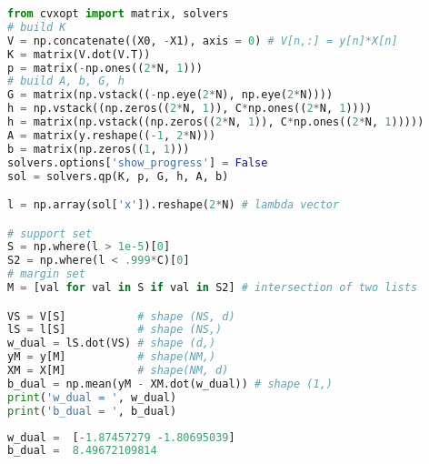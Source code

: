 \begin{lstlisting}[language=Python]
from cvxopt import matrix, solvers
# build K
V = np.concatenate((X0, -X1), axis = 0) # V[n,:] = y[n]*X[n]
K = matrix(V.dot(V.T))
p = matrix(-np.ones((2*N, 1)))
# build A, b, G, h
G = matrix(np.vstack((-np.eye(2*N), np.eye(2*N))))
h = np.vstack((np.zeros((2*N, 1)), C*np.ones((2*N, 1))))
h = matrix(np.vstack((np.zeros((2*N, 1)), C*np.ones((2*N, 1)))))
A = matrix(y.reshape((-1, 2*N)))
b = matrix(np.zeros((1, 1)))
solvers.options['show_progress'] = False
sol = solvers.qp(K, p, G, h, A, b)

l = np.array(sol['x']).reshape(2*N) # lambda vector

# support set
S = np.where(l > 1e-5)[0]
S2 = np.where(l < .999*C)[0]
# margin set
M = [val for val in S if val in S2] # intersection of two lists

VS = V[S]           # shape (NS, d)
lS = l[S]           # shape (NS,)
w_dual = lS.dot(VS) # shape (d,)
yM = y[M]           # shape(NM,)
XM = X[M]           # shape(NM, d)
b_dual = np.mean(yM - XM.dot(w_dual)) # shape (1,)
print('w_dual = ', w_dual)
print('b_dual = ', b_dual)
\end{lstlisting}
\kq
\begin{lstlisting}[language=Python]
w_dual =  [-1.87457279 -1.80695039]
b_dual =  8.49672109814
\end{lstlisting}




